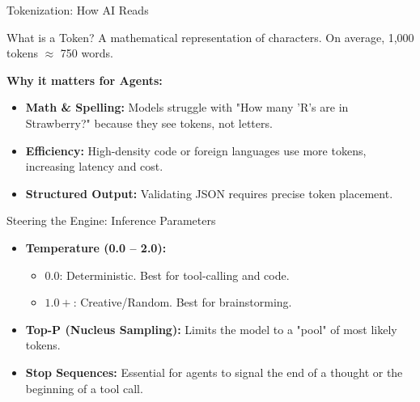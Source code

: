 \documentclass{beamer}       %
\begin{document}
\begin{frame}{Tokenization: How AI Reads}
    \begin{block}{What is a Token?}
        A mathematical representation of characters. On average, 1,000 tokens $\approx$ 750 words.
    \end{block}
    \vspace{0.3cm}
    \textbf{Why it matters for Agents:}
    \begin{itemize}
        \item \textbf{Math \& Spelling:} Models struggle with "How many 'R's are in Strawberry?" because they see tokens, not letters.
        \item \textbf{Efficiency:} High-density code or foreign languages use more tokens, increasing latency and cost.
        \item \textbf{Structured Output:} Validating JSON requires precise token placement.
    \end{itemize}
\end{frame}

\begin{frame}{Steering the Engine: Inference Parameters}
    \begin{itemize}
        \item \textbf{Temperature (0.0 -- 2.0):} 
            \begin{itemize}
                \item $0.0$: Deterministic. Best for tool-calling and code.
                \item $1.0+$: Creative/Random. Best for brainstorming.
            \end{itemize}
        \item \textbf{Top-P (Nucleus Sampling):} Limits the model to a "pool" of most likely tokens.
        \item \textbf{Stop Sequences:} Essential for agents to signal the end of a thought or the beginning of a tool call.
    \end{itemize}
\end{frame}
\end{document}
